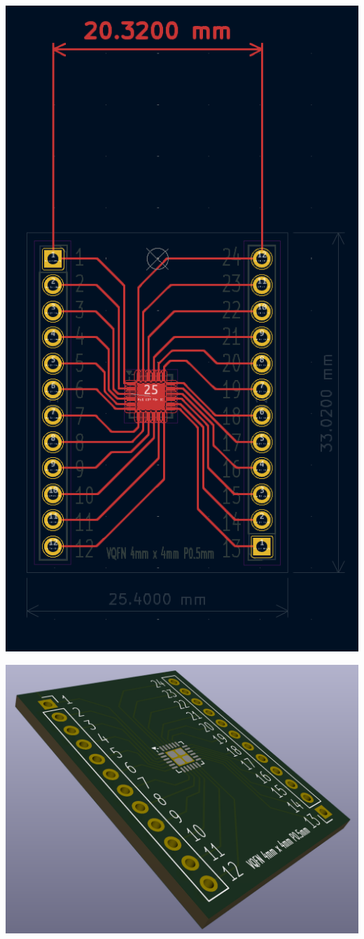 \documentclass[11pt,a4paper,titlepage]{report}
\begin{document}
	\begin{center}
		\label{picture:breakout2}
		\includegraphics[width= \linewidth]{assets/breakout_pcb_schema.png}
	\end{center}
	\begin{center}
		\label{picture:breakout3}
		\includegraphics[width= \linewidth]{assets/breakout_pcb_3d.png}
	\end{center}
	
	\printbibliography
\end{document}
